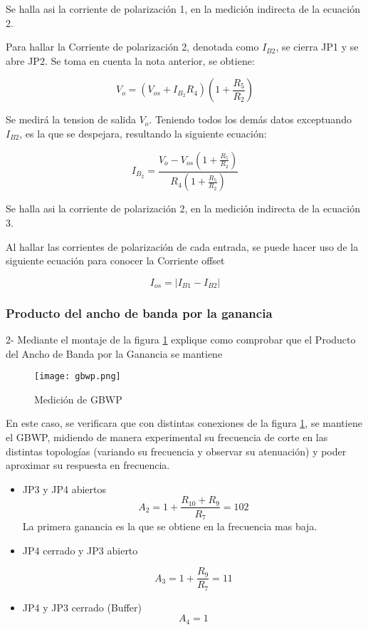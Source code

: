  Se halla asi la corriente de polarización 1, en la medición indirecta de la ecuación 2.

Para hallar la Corriente de polarización 2, denotada como $I_{B2}$, se cierra JP1 y se
abre JP2. Se toma en cuenta la nota anterior, se obtiene:

\begin{equation}
    V_o = \left( V_{os} + I_{B_2} R_4 \right) \left( 1 + \frac{R_5}{R_2} \right)
\end{equation}

Se medirá la tension de salida $V_o$. Teniendo todos los demás datos exceptuando $I_{B2}$, es la que se despejara, resultando la siguiente ecuación:

\begin{equation}
    \boxed{I_{B_2} = \frac{V_o - V_{os} \left( 1 + \frac{R_5}{R_2} \right)}{R_4 \left( 1 + \frac{R_5}{R_2} \right)}}
\end{equation}

Se halla asi la corriente de polarización 2, en la medición indirecta de la ecuación 3.

Al hallar las corrientes de polarización de cada entrada, se puede hacer uso de la siguiente ecuación para conocer la Corriente offset

\begin{equation}
    \boxed{I_{os} = \left| I_{B1} - I_{B2} \right|}
\end{equation}

\subsubsection{Producto del ancho de banda por la ganancia}

2- Mediante el montaje de la figura \ref{fig:gbwp} explique como comprobar que el Producto del Ancho de Banda por la Ganancia
se mantiene

\begin{figure}[ht]
    \centering
    \texttt{[image: gbwp.png]}
    \caption{Medición de GBWP}
    \label{fig:gbwp}
\end{figure}

En este caso, se verificara que con distintas conexiones de la figura \ref{fig:gbwp}, se mantiene el GBWP, midiendo de manera experimental su frecuencia de corte en las distintas topologías
(variando su frecuencia y observar su atenuación) y poder aproximar su respuesta en frecuencia.

\begin{itemize}
    \item JP3 y JP4 abiertos
    $$A_2 = 1 + \frac{R_{10} + R_9}{R_7} = 102$$
    La primera ganancia es la que se obtiene en la frecuencia mas baja.
    \item JP4 cerrado y JP3 abierto

    $$A_3 = 1 + \frac{R_9}{R_7} = 11$$

    \item JP4 y JP3 cerrado (Buffer)
    $$A_4=1$$

\end{itemize}

